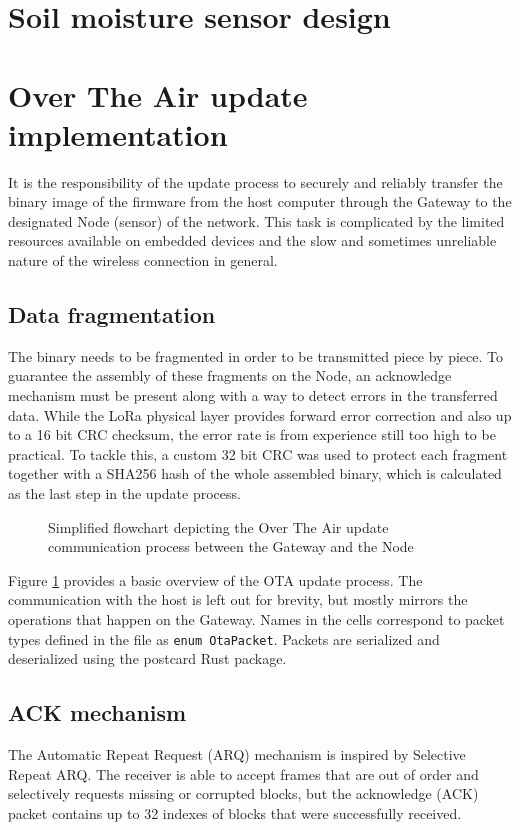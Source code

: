 \section{Soil moisture sensor design}

\section{Over The Air update implementation}
It is the responsibility of the update process to securely and reliably transfer the binary image of the firmware from the host computer through the Gateway to the designated Node (sensor) of the network. This task is complicated by the limited resources available on embedded devices and the slow and sometimes unreliable nature of the wireless connection in general.

\subsection{Data fragmentation}
The binary needs to be fragmented in order to be transmitted piece by piece. To guarantee the assembly of these fragments on the Node, an acknowledge mechanism must be present along with a way to detect errors in the transferred data. While the LoRa physical layer provides forward error correction and also up to a 16 bit CRC checksum, the error rate is from experience still too high to be practical. To tackle this, a custom 32 bit CRC was used to protect each fragment together with a SHA256 hash of the whole assembled binary, which is calculated as the last step in the update process.

\begin{figure}[p]
    
    \caption{\label{fig:ota-algo}Simplified flowchart depicting the Over The Air update communication process between the Gateway and the Node}
\end{figure}

Figure \ref{fig:ota-algo} provides a basic overview of the OTA update process. The communication with the host is left out for brevity, but mostly mirrors the operations that happen on the Gateway. Names in the cells correspond to packet types defined in the  file as \lstinline|enum OtaPacket|. Packets are serialized and deserialized using the postcard Rust package.

\subsection{ACK mechanism}
The Automatic Repeat Request (ARQ) mechanism is inspired by Selective Repeat ARQ. The receiver is able to accept frames that are out of order and selectively requests missing or corrupted blocks, but the acknowledge (ACK) packet contains up to 32 indexes of blocks that were successfully received. 

